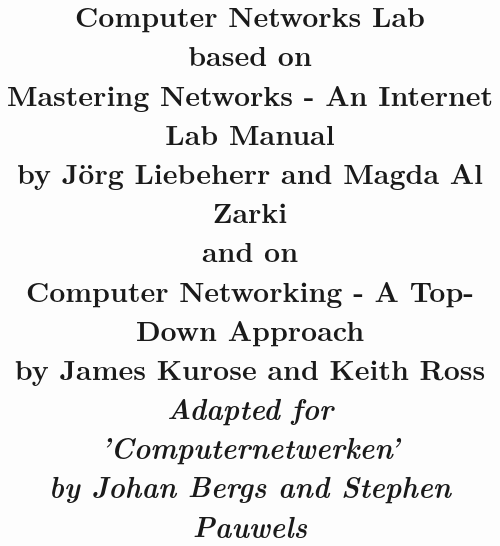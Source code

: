 \usepackage{a4wide}
\usepackage[printonlyused]{acronym}
\usepackage{amsmath}
\usepackage{amssymb}
\usepackage{array}
\usepackage{boxedminipage}
\usepackage{calc}
\usepackage{cite}
\usepackage{color}
\usepackage[inline]{enumitem}
\usepackage{fancyvrb}
\usepackage[draft]{fixme}
\usepackage[T1]{fontenc}
\usepackage{framed}
\usepackage{ifthen}
\usepackage{xifthen}
\usepackage{forloop}
\usepackage[pdftex]{graphicx}
\usepackage{helvet}
\usepackage[colorlinks,linkcolor=black,urlcolor=blue]{hyperref}
\usepackage{listings}
\usepackage{longtable}
\usepackage{ifthen}
\usepackage{listings}
\usepackage{longtable}
\usepackage{multirow}
\usepackage{subfig}
\usepackage{tikz}
\usepackage{titlesec}
\usepackage{verbatim}
\usepackage{xspace}
\usepackage{import}
\usepackage{standalone}
\usepackage{accsupp}
\usepackage{dirtree}

\setlength{\parindent}{0pt}

\title{
	\textbf{Computer Networks Lab\\ \vspace{5mm} based on \vspace{1mm} \\ Mastering Networks - An Internet Lab Manual\\
		by J\"{o}rg Liebeherr and Magda Al Zarki \\ \vspace{5mm} and on \vspace{1mm} \\ Computer Networking - A Top-Down Approach \\
		by James Kurose and Keith Ross}\\
	\vspace{10mm}
	\large{\emph{Adapted for \\ 'Computernetwerken' \\
			by Johan Bergs and Stephen Pauwels}} \\
}

\providecommand{\texroot}{.}
\newcommand{\images}{\texroot/images}

\newcommand{\labdir}{\texroot/Lab\thechapter}

\renewcommand{\chaptername}{Lab}
\newcommand{\stress}[1]{\emph{\textbf{#1}}} 
\newcommand{\incommand}[1]{\texttt{#1}}
\newcommand{\ipaddr}[1]{\texttt{#1}}

